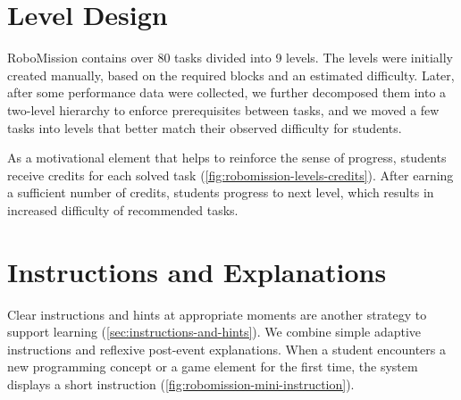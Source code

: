 \section{Level Design}
\label{sec:level-design}


RoboMission contains over 80 tasks divided into 9 levels.
The levels were initially created manually, based on the required blocks
and an estimated difficulty. Later, after some performance data
were collected, we further decomposed them into a two-level
hierarchy to enforce prerequisites between tasks, and we moved
a few tasks into levels that better match their observed
difficulty for students.


As a motivational element that helps to reinforce the sense of progress,
students receive credits for each solved task
(\cref{fig:robomission-levels-credits}).
After earning a sufficient number of credits, students progress to next level,
which results in increased difficulty of recommended tasks.



\section{Instructions and Explanations}
\label{sec:game.explanations}

Clear instructions and hints at appropriate moments
are another strategy to support learning
(\cref{sec:instructions-and-hints}).
We combine simple adaptive instructions and reflexive post-event explanations.
When a student encounters a new programming concept or a game element
for the first time, the system displays a short instruction
(\cref{fig:robomission-mini-instruction}).


